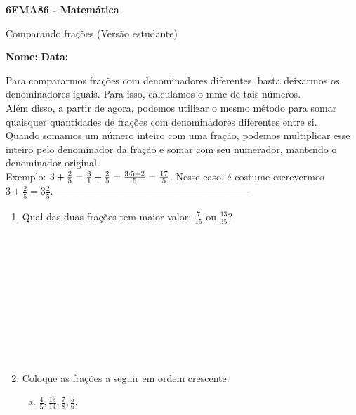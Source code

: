 \documentclass[a4paper,14pt]{article}
\begin{document}
	
	\noindent\textbf{6FMA86 - Matemática} 
	
	\begin{center}Comparando frações (Versão estudante)
	\end{center}
	
	\noindent\textbf{Nome:} \underline{\hspace{10cm}}
	\noindent\textbf{Data:} \underline{\hspace{4cm}}
	
	
	\begin{multicols}{2}
		\noindent Para compararmos frações com denominadores diferentes, basta deixarmos os denominadores iguais. Para isso, calculamos o mmc de tais números. \\
		Além disso, a partir de agora, podemos utilizar o mesmo método para somar quaisquer quantidades de frações com denominadores diferentes entre si. \\
		Quando somamos um número inteiro com uma fração, podemos multiplicar esse inteiro pelo denominador da fração e somar com seu numerador, mantendo o denominador original. \\
		Exemplo: $3 + \frac{2}{5} = \frac{3}{1} + \frac{2}{5} \\\\ = \frac{3 \cdot 5 + 2}{5} = \frac{17}{5}$. Nesse caso, é costume escrevermos $3 + \frac{2}{5} = 3\frac{2}{5}$. 
		\noindent\textsubscript{-----------------------------------------------------------------------}
		\begin{enumerate} 
			\item Qual das duas frações tem maior valor: $\frac{7}{15}$ ou $\frac{13}{35}$? \\\\\\\\\\\\\\\\\\\\\\
			\item Coloque as frações a seguir em ordem crescente.
			\begin{enumerate}[a)]
				\item $\frac{4}{5}, \frac{13}{14}, \frac{7}{8}, \frac{5}{6}$. \\\\\\\\\\\\\\\\\\\\\\\\\\\\

\end{enumerate}
\end{enumerate}
\end{multicols}
\end{document}
